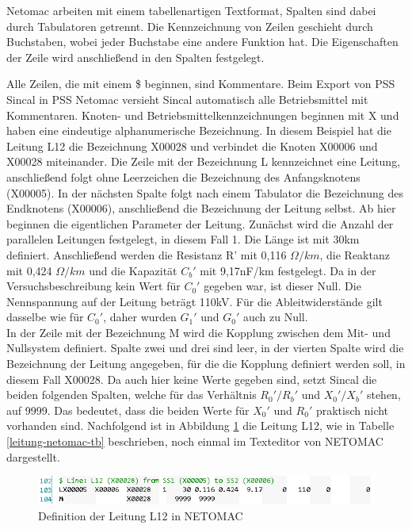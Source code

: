 \documentclass{scrartcl}
\begin{document}
\begin{onehalfspace}
Netomac arbeiten mit einem tabellenartigen Textformat, Spalten sind dabei durch Tabulatoren getrennt. Die Kennzeichnung von Zeilen geschieht durch Buchstaben, wobei jeder Buchstabe eine andere Funktion hat. Die Eigenschaften der Zeile wird anschließend in den Spalten festgelegt.

Alle Zeilen, die mit einem \$ beginnen, sind Kommentare. Beim Export von PSS Sincal in PSS Netomac versieht Sincal automatisch alle Betriebsmittel mit Kommentaren. Knoten- und Betriebsmittelkennzeichnungen beginnen mit X und haben eine eindeutige alphanumerische Bezeichnung. In diesem Beispiel hat die Leitung L12 die Bezeichnung X00028 und verbindet die Knoten X00006 und X00028 miteinander. Die Zeile mit der Bezeichnung L kennzeichnet eine Leitung, anschließend folgt ohne Leerzeichen die Bezeichnung des Anfangsknotens (X00005). In der nächsten Spalte folgt nach einem Tabulator die Bezeichnung des Endknotens (X00006), anschließend die Bezeichnung der Leitung selbst. Ab hier beginnen die eigentlichen Parameter der Leitung. Zunächst wird die Anzahl der parallelen Leitungen festgelegt, in diesem Fall 1. Die Länge ist mit 30km definiert. Anschließend werden die Resistanz R' mit 0,116 $\Omega /km$, die Reaktanz mit 0,424 $\Omega /km$ und die Kapazität $C_b'$ mit 9,17nF/km festgelegt. Da in der Versuchsbeschreibung kein Wert für $C_0'$ gegeben war, ist dieser Null. Die Nennspannung auf der Leitung beträgt 110kV. Für die Ableitwiderstände gilt dasselbe wie für $C_0'$, daher wurden $G_1'$ und $G_0'$ auch zu Null.\\
In der Zeile mit der Bezeichnung M wird die Kopplung zwischen dem Mit- und Nullsystem definiert. Spalte zwei und drei sind leer, in der vierten Spalte wird die Bezeichnung der Leitung angegeben, für die die Kopplung definiert werden soll, in diesem Fall X00028. Da auch hier keine Werte gegeben sind, setzt Sincal die beiden folgenden Spalten, welche für das Verhältnis $R_0'/R_b'$ und $X_0'/X_b'$ stehen, auf 9999. Das bedeutet, dass die beiden Werte für $X_0'$ und $R_0'$ praktisch nicht vorhanden sind. Nachfolgend ist in Abbildung \ref{leitung-netomac} die Leitung L12, wie in Tabelle \ref{leitung-netomac-tb} beschrieben, noch einmal im Texteditor von NETOMAC dargestellt.

	\begin{figure}[H]
	\centering
	\includegraphics[scale=0.75]{img/netomac-l12.png}
	\caption{Definition der Leitung L12 in NETOMAC}
	\label{leitung-netomac}
	\end{figure}
	

\end{onehalfspace}
\end{document}
